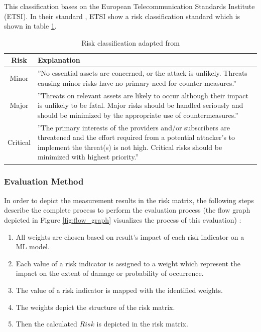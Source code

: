 This classification bases on the European Telecommunication Standards Institute (ETSI). In their standard \cite{applications_2022}, ETSI show a risk classification standard which is shown in table \ref{tab:risk_classify}.

\begin{table}[h]
\centering
  \begin{tabular}{|c|p{10cm}|}
  \hline
  \rowcolor{lightgray} Risk & Explanation \\
  \hline
  Minor & ''No essential assets are concerned, or the attack is unlikely. Threats causing minor risks have no
primary need for counter measures.''  \\
  \hline
  Major & ''Threats on relevant assets are likely to occur although their impact is unlikely to be fatal. Major
risks should be handled seriously and should be minimized by the appropriate use of
countermeasures.'' \\
  \hline
  Critical & ''The primary interests of the providers and/or subscribers are threatened and the effort required
from a potential attacker's to implement the threat(s) is not high. Critical risks should be
minimized with highest priority.'' \\
  \hline
  \end{tabular}
\caption{Risk classification adapted from \cite{applications_2022}}
\label{tab:risk_classify}
\end{table}

\subsubsection*{Evaluation Method}

In order to depict the measurement results in the risk matrix, the following steps describe the complete process to perform the evaluation process (the flow graph depicted in Figure \ref{fig:flow_graph} visualizes the process of this evaluation) \cite{DBLP:journals/corr/abs-2012-04884}:

\begin{enumerate}
  \item All weights are chosen based on result's impact of each risk indicator on a ML model.
  \item Each value of a risk indicator is assigned to a weight which represent the impact on the extent of damage or probability of occurrence.
  \item The value of a risk indicator is mapped with the identified weights.
  \item The weights depict the structure of the risk matrix.
  \item Then the calculated $Risk$ is depicted in the risk matrix.
\end{enumerate}

